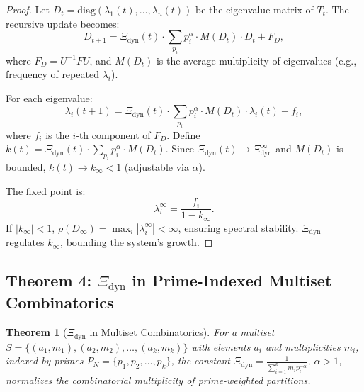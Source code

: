 \documentclass{article}
\theoremstyle{plain}
\newtheorem{theorem}{Theorem}
\begin{document}
\begin{itemize}
\begin{proof}
Let \( D_t = \text{diag}(\lambda_1(t), \ldots, \lambda_n(t)) \) be the eigenvalue matrix of \( T_t \). The recursive update becomes:
\[
D_{t+1} = \Xi_{\text{dyn}}(t) \cdot \sum_{p_i} p_i^\alpha \cdot M(D_t) \cdot D_t + F_D,
\]
where \( F_D = U^{-1} F U \), and \( M(D_t) \) is the average multiplicity of eigenvalues (e.g., frequency of repeated $\lambda_i$).

For each eigenvalue:
\[
\lambda_i(t+1) = \Xi_{\text{dyn}}(t) \cdot \sum_{p_i} p_i^\alpha \cdot M(D_t) \cdot \lambda_i(t) + f_i,
\]
where \( f_i \) is the $i$-th component of \( F_D \). Define \( k(t) = \Xi_{\text{dyn}}(t) \cdot \sum_{p_i} p_i^\alpha \cdot M(D_t) \). Since \( \Xi_{\text{dyn}}(t) \to \Xi_{\text{dyn}}^\infty \) and \( M(D_t) \) is bounded, \( k(t) \to k_\infty < 1 \) (adjustable via $\alpha$).

The fixed point is:
\[
\lambda_i^\infty = \frac{f_i}{1 - k_\infty}.
\]
If \( |k_\infty| < 1 \), $\rho(D_\infty) = \max_i |\lambda_i^\infty| < \infty$, ensuring spectral stability. $\Xi_{\text{dyn}}$ regulates \( k_\infty \), bounding the system’s growth.
\end{proof}

\subsection{Theorem 4: $\Xi_{\text{dyn}}$ in Prime-Indexed Multiset Combinatorics}
\begin{theorem}[$\Xi_{\text{dyn}}$ in Multiset Combinatorics]
For a multiset \( S = \{ (a_1, m_1), (a_2, m_2), \ldots, (a_k, m_k) \} \) with elements \( a_i \) and multiplicities \( m_i \), indexed by primes \( P_N = \{ p_1, p_2, \ldots, p_k \} \), the constant $\Xi_{\text{dyn}} = \frac{1}{\sum_{i=1}^k m_i p_i^{-\alpha}}$, \(\alpha > 1\), normalizes the combinatorial multiplicity of prime-weighted partitions.
\end{theorem}


\end{itemize}
\end{document}
